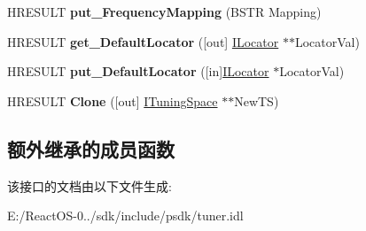\begin{DoxyCompactItemize}
\mbox{\label{interface_i_tuning_space_aaba08cb8d385c962cc5459a6740d3575}} 
H\+R\+E\+S\+U\+LT {\bfseries put\+\_\+\+Frequency\+Mapping} (B\+S\+TR Mapping)
\item 
\mbox{\label{interface_i_tuning_space_a3984def063ec81e94ffa0140d0dd9d72}} 
H\+R\+E\+S\+U\+LT {\bfseries get\+\_\+\+Default\+Locator} (\mbox{[}out\mbox{]} \hyperlink{interface_i_locator}{I\+Locator} $\ast$$\ast$Locator\+Val)
\item 
\mbox{\label{interface_i_tuning_space_a17cb5d2f673f12aeb25b72200bfa76c6}} 
H\+R\+E\+S\+U\+LT {\bfseries put\+\_\+\+Default\+Locator} (\mbox{[}in\mbox{]}\hyperlink{interface_i_locator}{I\+Locator} $\ast$Locator\+Val)
\item 
\mbox{\label{interface_i_tuning_space_ab7c43b9bdd613318df247ace2dffcdff}} 
H\+R\+E\+S\+U\+LT {\bfseries Clone} (\mbox{[}out\mbox{]} \hyperlink{interface_i_tuning_space}{I\+Tuning\+Space} $\ast$$\ast$New\+TS)
\end{DoxyCompactItemize}
\subsection*{额外继承的成员函数}


该接口的文档由以下文件生成\+:\begin{DoxyCompactItemize}
\item 
E\+:/\+React\+O\+S-\/0../sdk/include/psdk/tuner.\+idl\end{DoxyCompactItemize}
